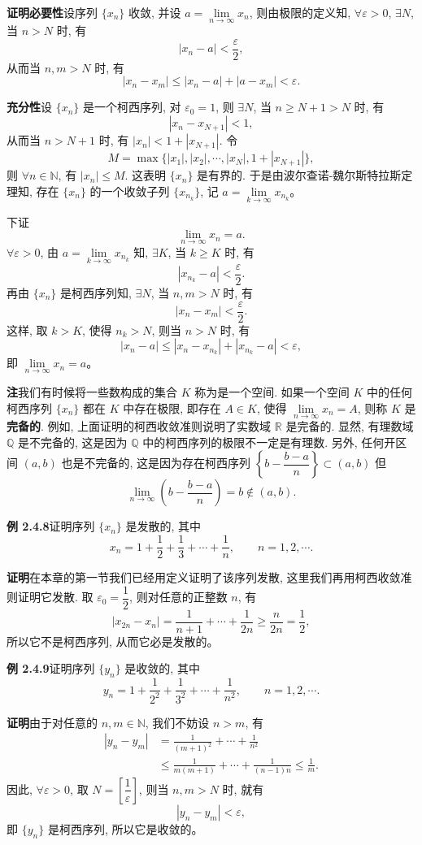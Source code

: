 \documentclass[UTF8,12pt,a4paper,fontset=fandol]{ctexart}
\begin{document}
\noindent\textbf{证明}\quad \textbf{必要性}\quad 设序列 $\{x_n\}$ 收敛, 并设 $a=\lim\limits_{n\to\infty}x_n$, 则由极限的定义知, $\forall\varepsilon>0$, $\exists N$, 当 $n>N$ 时, 有
\[
  |x_n-a|<\frac\varepsilon2,
\]
从而当 $n,m>N$ 时, 有
\[
  |x_n-x_m|\leqslant |x_n-a|+|a-x_m|<\varepsilon.
\]

\textbf{充分性}\quad 设 $\{x_n\}$ 是一个柯西序列, 对 $\varepsilon_0=1$, 则 $\exists N$, 当 $n\geqslant N+1>N$ 时, 有
\[
  |x_n-x_{N+1}|<1,
\]
从而当 $n>N+1$ 时, 有 $|x_n|<1+|x_{N+1}|$. 令
\[
  M=\max\{|x_1|,|x_2|,\cdots,|x_N|,1+|x_{N+1}|\},
\]
则 $\forall n\in\mathbb{N}$, 有 $|x_n|\leqslant M$. 这表明 $\{x_n\}$ 是有界的. 于是由波尔查诺-魏尔斯特拉斯定理知, 存在 $\{x_n\}$ 的一个收敛子列 $\{x_{n_k}\}$, 记 $a=\lim\limits_{k\to\infty}x_{n_k}$。

下证
\[
  \lim_{n\to\infty}x_n=a.
\]
$\forall\varepsilon>0$, 由 $a=\lim\limits_{k\to\infty}x_{n_k}$ 知, $\exists K$, 当 $k\geqslant K$ 时, 有
\[
  |x_{n_k}-a|<\frac\varepsilon2.
\]
再由 $\{x_n\}$ 是柯西序列知, $\exists N$, 当 $n,m>N$ 时, 有
\[
  |x_n-x_m|<\frac\varepsilon2.
\]
这样, 取 $k>K$, 使得 $n_k>N$, 则当 $n>N$ 时, 有
\[
  |x_n-a|\leqslant |x_n-x_{n_k}|+|x_{n_k}-a|<\varepsilon,
\]
即 $\lim\limits_{n\to\infty}x_n=a$。

\noindent\textbf{注}\quad 我们有时候将一些数构成的集合 $K$ 称为是一个空间. 如果一个空间 $K$ 中的任何柯西序列 $\{x_n\}$ 都在 $K$ 中存在极限, 即存在 $A\in K$, 使得 $\lim\limits_{n\to\infty}x_n=A$, 则称 $K$ 是\textbf{完备的}. 例如, 上面证明的柯西收敛准则说明了实数域 $\mathbb{R}$ 是完备的. 显然, 有理数域 $\mathbb{Q}$ 是不完备的, 这是因为 $\mathbb{Q}$ 中的柯西序列的极限不一定是有理数. 另外, 任何开区间 $(a,b)$ 也是不完备的, 这是因为存在柯西序列 $\left\{b-\dfrac{b-a}{n}\right\}\subset(a,b)$ 但
\[
  \lim_{n\to\infty}\left(b-\frac{b-a}{n}\right)=b\notin(a,b).
\]

\noindent\textbf{例 2.4.8}\quad 证明序列 $\{x_n\}$ 是发散的, 其中
\[
  x_n=1+\frac12+\frac13+\cdots+\frac1n,\qquad n=1,2,\cdots.
\]

\noindent\textbf{证明}\quad 在本章的第一节我们已经用定义证明了该序列发散, 这里我们再用柯西收敛准则证明它发散. 取 $\varepsilon_0=\dfrac12$, 则对任意的正整数 $n$, 有
\[
  |x_{2n}-x_n|
  =
  \frac1{n+1}+\cdots+\frac1{2n}
  \geqslant \frac n{2n}=\frac12,
\]
所以它不是柯西序列, 从而它必是发散的。

\noindent\textbf{例 2.4.9}\quad 证明序列 $\{y_n\}$ 是收敛的, 其中
\[
  y_n=1+\frac1{2^2}+\frac1{3^2}+\cdots+\frac1{n^2},\qquad n=1,2,\cdots.
\]

\noindent\textbf{证明}\quad 由于对任意的 $n,m\in\mathbb{N}$, 我们不妨设 $n>m$, 有
\[
\begin{aligned}
  |y_n-y_m|
  &=
  \frac1{(m+1)^2}+\cdots+\frac1{n^2}\\
  &\leqslant
  \frac1{m(m+1)}+\cdots+\frac1{(n-1)n}
  \leqslant \frac1m.
\end{aligned}
\]
因此, $\forall\varepsilon>0$, 取 $N=\left[\dfrac1\varepsilon\right]$, 则当 $n,m>N$ 时, 就有
\[
  |y_n-y_m|<\varepsilon,
\]
即 $\{y_n\}$ 是柯西序列, 所以它是收敛的。
\end{document}

